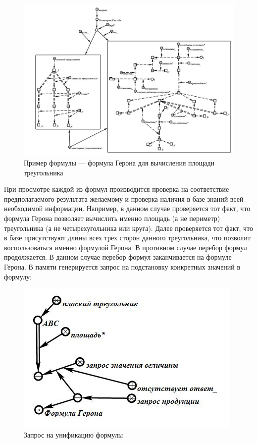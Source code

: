 \begin{figure}[H]
	\includegraphics[width=1\linewidth]{images/part7/chapter_learning_systems/step4.jpg}
	\caption{Пример формулы --- формула Герона для вычисления площади треугольника}
	\label{fig:step4}
\end{figure}

При просмотре каждой из формул производится проверка на соответствие предполагаемого результата желаемому и проверка наличия в базе знаний всей необходимой информации. Например, в данном случае проверяется тот факт, что формула Герона позволяет вычислить именно площадь (а не периметр) треугольника (а не четырехугольника или круга). Далее проверяется тот факт, что в базе присутствуют длины всех трех сторон данного треугольника, что позволит воспользоваться именно формулой Герона. В противном случае перебор формул продолжается. В данном случае перебор формул заканчивается на формуле Герона. В памяти генерируется запрос на подстановку конкретных значений в формулу:

\begin{figure}[H]
	\includegraphics[scale=0.5]{images/part7/chapter_learning_systems/step5.jpg}
	\caption{Запрос на унификацию формулы}
	\label{fig:step5}
\end{figure}

